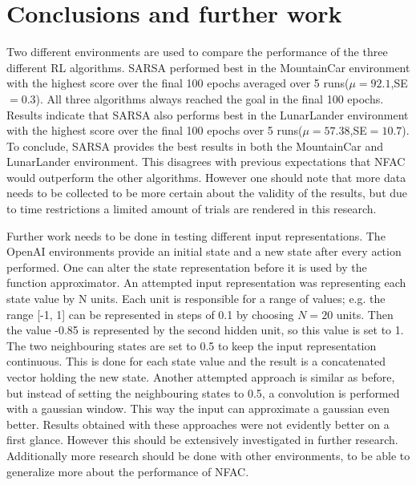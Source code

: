 
\section{Conclusions and further work}
Two different environments are used to compare the performance of the three different RL algorithms. SARSA performed best in the MountainCar environment with the highest score over the final 100 epochs averaged over 5 runs($\mu=92.1$,SE$=0.3$). All three algorithms always reached the goal in the final 100 epochs. Results indicate that SARSA also performs best in the LunarLander environment with the highest score over the final 100 epochs over 5 runs($\mu=57.38$,SE$=10.7$). To conclude, SARSA provides the best results in both the MountainCar and LunarLander environment. This disagrees with previous expectations that NFAC would outperform the other algorithms. However one should note that more data needs to be collected to be more certain about the validity of the results, but due to time restrictions a limited amount of trials are rendered in this research.  

Further work needs to be done in testing different input representations. The OpenAI environments provide an initial state and a new state after every action performed. One can alter the state representation before it is used by the function approximator. An attempted input representation was representing each state value by N units. Each unit is responsible for a range of values; e.g. the range [-1, 1] can be represented in steps of 0.1 by choosing $N=20$ units. Then the value -0.85 is represented by the second hidden unit, so this value is set to 1. The two neighbouring states are set to 0.5 to keep the input representation continuous. This is done for each state value and the result is a concatenated vector holding the new state. Another attempted approach is similar as before, but instead of setting the neighbouring states to 0.5, a convolution is performed with a gaussian window. This way the input can approximate a gaussian even better. Results obtained with these approaches were not evidently better on a first glance. However this should be extensively investigated in further research. Additionally more research should be done with other environments, to be able to generalize more about the performance of NFAC.

